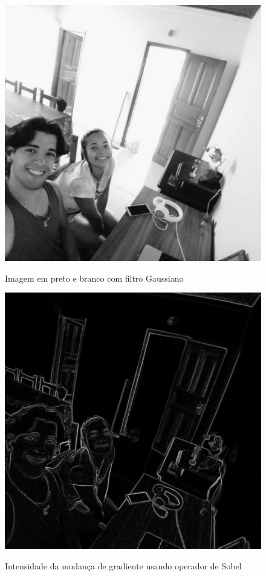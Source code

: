 \begin{figure}[H]
	\centering
    \caption{Imagem em preto e branco com filtro Gaussiano}
	\includegraphics[scale=0.25]{figuras/filter/sobel/f_normal.jpeg}
	\label{fig:Imagem em preto e branco com filtro de gaus}
\end{figure}

\begin{figure}[H]
	\centering
    \caption{Intensidade da mudança de gradiente usando operador de Sobel}
	\includegraphics[scale=0.25]{figuras/filter/sobel/f_sobel.jpeg}
	\label{fig:Intensidade da mudanca de gradiente}
\end{figure}



